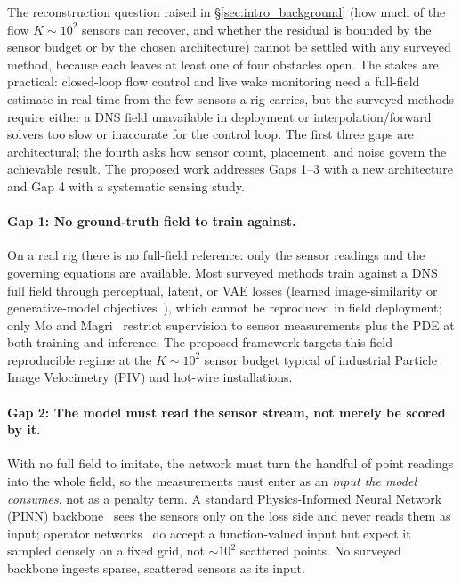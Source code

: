 The reconstruction question raised in \S\ref{sec:intro_background} (how much of the flow $K\sim 10^2$ sensors can recover, and whether the residual is bounded by the sensor budget or by the chosen architecture) cannot be settled with any surveyed method, because each leaves at least one of four obstacles open. The stakes are practical: closed-loop flow control and live wake monitoring need a full-field estimate in real time from the few sensors a rig carries, but the surveyed methods require either a DNS field unavailable in deployment or interpolation/forward solvers too slow or inaccurate for the control loop. The first three gaps are architectural; the fourth asks how sensor count, placement, and noise govern the achievable result. The proposed work addresses Gaps 1--3 with a new architecture and Gap 4 with a systematic sensing study.

\paragraph{Gap 1: No ground-truth field to train against.}
On a real rig there is no full-field reference: only the sensor readings and the governing equations are available. Most surveyed methods train against a DNS full field through perceptual, latent, or VAE losses (learned image-similarity or generative-model objectives~\cite{Williams2024SHRED, Senseiver2023, FLRNet2024, EnergyTransformer2025}), which cannot be reproduced in field deployment; only Mo and Magri~\cite{Mo2025PRF} restrict supervision to sensor measurements plus the PDE at both training and inference. The proposed framework targets this field-reproducible regime at the $K \sim 10^2$ sensor budget typical of industrial Particle Image Velocimetry (PIV) and hot-wire installations.

\paragraph{Gap 2: The model must read the sensor stream, not merely be scored by it.}
With no full field to imitate, the network must turn the handful of point readings into the whole field, so the measurements must enter as an \emph{input the model consumes}, not as a penalty term. A standard Physics-Informed Neural Network (PINN) backbone~\cite{wang2025gradientalignmentpinns,Wang2024JMLR} sees the sensors only on the loss side and never reads them as input; operator networks~\cite{Lu2021NMI,Li2021FNO,Kovachki2023JMLR} do accept a function-valued input but expect it sampled densely on a fixed grid, not $\sim 10^2$ scattered points. No surveyed backbone ingests sparse, scattered sensors as its input.

